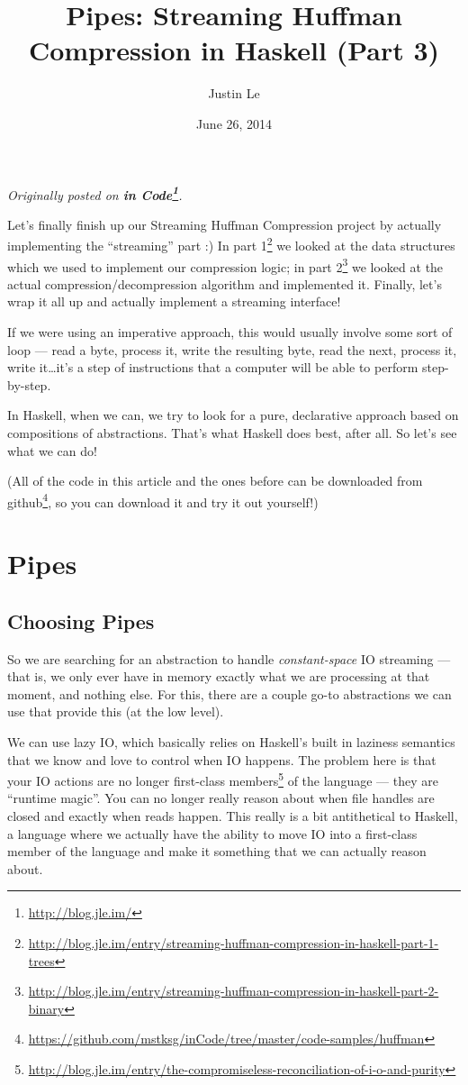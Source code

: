 \documentclass[]{article}
\title{Pipes: Streaming Huffman Compression in Haskell (Part 3)}
\author{Justin Le}
\date{June 26, 2014}
\renewcommand{\href}[2]{#2\footnote{\url{#1}}}
\begin{document}
\maketitle

\emph{Originally posted on \textbf{\href{http://blog.jle.im/}{in
Code}}.}

Let's finally finish up our Streaming Huffman Compression project by
actually implementing the ``streaming'' part :) In
\href{http://blog.jle.im/entry/streaming-huffman-compression-in-haskell-part-1-trees}{part
1} we looked at the data structures which we used to implement our
compression logic; in
\href{http://blog.jle.im/entry/streaming-huffman-compression-in-haskell-part-2-binary}{part
2} we looked at the actual compression/decompression algorithm and
implemented it. Finally, let's wrap it all up and actually implement a
streaming interface!

If we were using an imperative approach, this would usually involve some
sort of loop --- read a byte, process it, write the resulting byte, read
the next, process it, write it\ldots{}it's a step of instructions that a
computer will be able to perform step-by-step.

In Haskell, when we can, we try to look for a pure, declarative approach
based on compositions of abstractions. That's what Haskell does best,
after all. So let's see what we can do!

(All of the code in this article and the ones before can be downloaded
\href{https://github.com/mstksg/inCode/tree/master/code-samples/huffman}{from
github}, so you can download it and try it out yourself!)

\section{Pipes}\label{pipes}

\subsection{Choosing Pipes}\label{choosing-pipes}

So we are searching for an abstraction to handle \emph{constant-space}
IO streaming --- that is, we only ever have in memory exactly what we
are processing at that moment, and nothing else. For this, there are a
couple go-to abstractions we can use that provide this (at the low
level).

We can use lazy IO, which basically relies on Haskell's built in
laziness semantics that we know and love to control when IO happens. The
problem here is that your IO actions are no longer
\href{http://blog.jle.im/entry/the-compromiseless-reconciliation-of-i-o-and-purity}{first-class
members} of the language --- they are ``runtime magic''. You can no
longer really reason about when file handles are closed and exactly when
reads happen. This really is a bit antithetical to Haskell, a language
where we actually have the ability to move IO into a first-class member
of the language and make it something that we can actually reason about.
\end{document}
